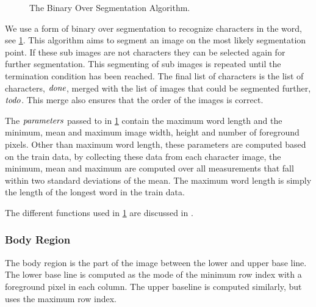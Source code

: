 \newcommand{\body}{\ensuremath{\t{body}}\xspace}
\newcommand{\strokewidth}{\ensuremath{\t{stroke\_w}}\xspace}
\newcommand{\segmentationpoints}{\ensuremath{\t{sps}}\xspace}
\newcommand{\segmentationpoint}{\ensuremath{\t{sp}}\xspace}
\newcommand{\image}{\ensuremath{\t{image}}\xspace}
\newcommand{\subimage}{\ensuremath{\t{sub\_image}}\xspace}
\newcommand{\leftsubimage}{\ensuremath{\t{left}}\xspace}
\newcommand{\rightsubimage}{\ensuremath{\t{right}}\xspace}
\newcommand{\segmentfurther}{\ensuremath{\t{todo}}\xspace}
\newcommand{\characters}{\ensuremath{\t{done}}\xspace}
\newcommand{\parameters}{\ensuremath{\t{parameters}}\xspace}

\begin{figure}[t]
	
	\caption{The Binary Over Segmentation Algorithm.}
	\label{alg:method:segmentation:algorithm}
\end{figure}

We use a form of binary over segmentation to recognize characters in the word, see \cref{alg:method:segmentation:algorithm}. This algorithm aims to segment an image on the most likely segmentation point. If these sub images are not characters they can be selected again for further segmentation. This segmenting of sub images is repeated until the termination condition has been reached. The final list of characters is the list of characters, \characters, merged with the list of images that could be segmented further, \segmentfurther. This merge also ensures that the order of the images is correct.

The \parameters passed to  in \cref{alg:method:segmentation:algorithm} contain the maximum word length and the minimum, mean and maximum image width, height and number of foreground pixels. Other than maximum word length, these parameters are computed based on the train data, by collecting these data from each character image, the minimum, mean and maximum are computed over all measurements that fall within two standard deviations of the mean. The maximum word length is simply the length of the longest word in the train data.

The different functions used in \cref{alg:method:segmentation:algorithm} are discussed in .

\subsubsection{Body Region}
\label{sss:method:segmentaton:bodyregion}
	The body region is the part of the image between the lower and upper base line. The lower base line is computed as the mode of the minimum row index with a foreground pixel in each column. The upper baseline is computed similarly, but uses the maximum row index.

